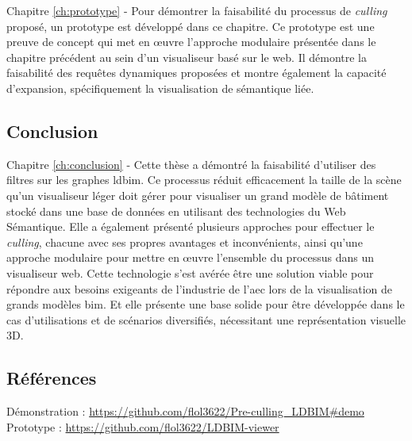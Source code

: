 \begin{refsection}
\begin{multicols}{2}
        \textsf{Chapitre \ref{ch:prototype} -}
        Pour démontrer la faisabilité du processus de \emph{culling} proposé, un prototype est développé dans ce chapitre. Ce prototype est une preuve de concept qui met en œuvre l'approche modulaire présentée dans le chapitre précédent au sein d'un visualiseur basé sur le web. Il démontre la faisabilité des requêtes dynamiques proposées et montre également la capacité d'expansion, spécifiquement la visualisation de sémantique liée.

        \subsection*{Conclusion}
        \textsf{Chapitre \ref{ch:conclusion} -} Cette thèse a démontré la faisabilité d'utiliser des filtres sur les graphes \ac{ldbim}. Ce processus réduit efficacement la taille de la scène qu'un visualiseur léger doit gérer pour visualiser un grand modèle de bâtiment stocké dans une base de données en utilisant des technologies du Web Sémantique. Elle a également présenté plusieurs approches pour effectuer le \emph{culling}, chacune avec ses propres avantages et inconvénients, ainsi qu'une approche modulaire pour mettre en œuvre l'ensemble du processus dans un visualiseur web. Cette technologie s'est avérée être une solution viable pour répondre aux besoins exigeants de l'industrie de l'\ac{aec} lors de la visualisation de grands modèles \ac{bim}. Et elle présente une base solide pour être développée dans le cas d'utilisations et de scénarios diversifiés, nécessitant une représentation visuelle 3D.
    \end{multicols}
    \subsection*{Références}
    \small
    {\renewcommand*{\bibfont}{\small}
        \printbibliography}

    \textsf{Démonstration :} \url{https://github.com/flol3622/Pre-culling_LDBIM#demo}\\
    \textsf{Prototype :} \url{https://github.com/flol3622/LDBIM-viewer}
\end{refsection}